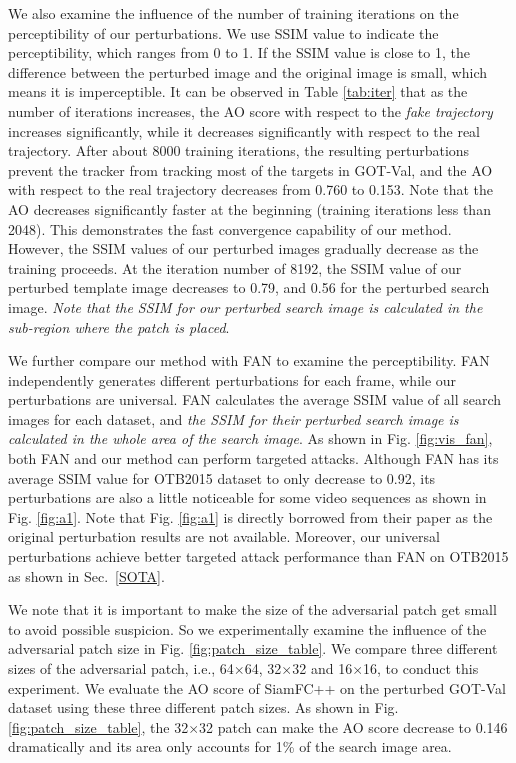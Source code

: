 \documentclass[journal]{IEEEtran}
\newcommand{\ie}{i.e.}
\renewcommand{\uline}{}
\begin{document}
We also examine the influence of the number of training iterations on the perceptibility of our perturbations. We use SSIM value to indicate the perceptibility, which ranges from 0 to 1. If the SSIM value is close to 1, the difference between the perturbed image and the original image is small, which means it is imperceptible. It can be observed in Table \ref{tab:iter} that as the number of iterations increases, the AO score with respect to the \textit{fake trajectory} increases significantly, while it decreases significantly with respect to the real trajectory. After about \uline{8000} training iterations, the resulting perturbations prevent the tracker from tracking most of the targets in GOT-Val, and the AO with respect to the real trajectory decreases from 0.760 to 0.153. Note that the AO decreases significantly faster at the beginning (training iterations less than 2048). This demonstrates the fast convergence capability of our method. However, the SSIM values of our perturbed images gradually decrease as the training proceeds. At the iteration number of 8192, the SSIM value of our perturbed template image decreases to 0.79, and 0.56 for the perturbed search image. \textit{Note that the SSIM for our perturbed search image is calculated in the sub-region where the patch is placed}.

We further compare our method with FAN \cite{FAN} to examine the perceptibility. FAN \uline{independently generates different perturbations} for each frame, while our perturbations are universal. FAN calculates the average SSIM value of all search images for each dataset, and \textit{the SSIM for their perturbed search image is calculated in the whole area of the search image}. As shown in Fig. \ref{fig:vis_fan}, both FAN and our method can perform targeted \uline{attacks}. Although FAN has its average SSIM value for OTB2015 dataset to only decrease to 0.92, its \uline{perturbations are} also a little noticeable for some video sequences as shown in Fig. \ref{fig:a1}. Note that Fig. \ref{fig:a1} is directly borrowed from their paper as the original perturbation results are not available. Moreover, our universal perturbations achieve better targeted attack performance than FAN on OTB2015 \uline{as shown in Sec.~\ref{SOTA}}.

We note that it is important to make the size of the adversarial patch get small to avoid possible suspicion. So we experimentally examine the influence of the adversarial patch size in Fig. \ref{fig:patch_size_table}. We compare three different sizes of the adversarial patch, \ie, 64$\times$64, 32$\times$32 and 16$\times$16, to conduct this experiment. We evaluate the AO score of SiamFC++ on the perturbed GOT-Val dataset using these three different patch sizes.
As shown in \uline{Fig.} \ref{fig:patch_size_table}, the 32$\times$32 patch can make the AO score decrease to 0.146 dramatically and its area only accounts for 1\% of the search image area.
\end{document}
